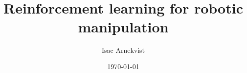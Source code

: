 \documentclass{kththesis}
\title{Reinforcement learning for robotic manipulation}
\author{Isac Arnekvist}
\date{\today}
\begin{document}

\frontmatter
\titlepage


\tableofcontents

\mainmatter

















{}



\end{document}

